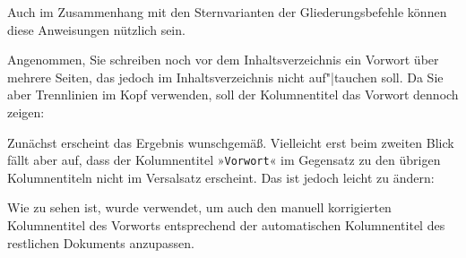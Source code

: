   Auch im Zusammenhang mit den Sternvarianten der Gliederungsbefehle können
  diese Anweisungen nützlich sein.%
    \begin{Example}
      Angenommen, Sie schreiben noch vor dem Inhaltsverzeichnis ein Vorwort
      über mehrere Seiten, das jedoch im Inhaltsverzeichnis nicht auf"|tauchen
      soll. Da Sie aber Trennlinien im Kopf verwenden, soll der Kolumnentitel
      das Vorwort dennoch zeigen:
      Zunächst erscheint das Ergebnis wunschgemäß. Vielleicht erst beim
      zweiten Blick fällt aber auf, dass der Kolumnentitel »\texttt{Vorwort}«
      im Gegensatz zu den übrigen Kolumnentiteln nicht im Versalsatz
      erscheint. Das ist jedoch leicht zu ändern:
      Wie zu sehen ist, wurde %
      verwendet, um auch den manuell korrigierten Kolumnentitel des Vorworts
      entsprechend der automatischen Kolumnentitel des restlichen Dokuments
      anzupassen.


\end{Example}

